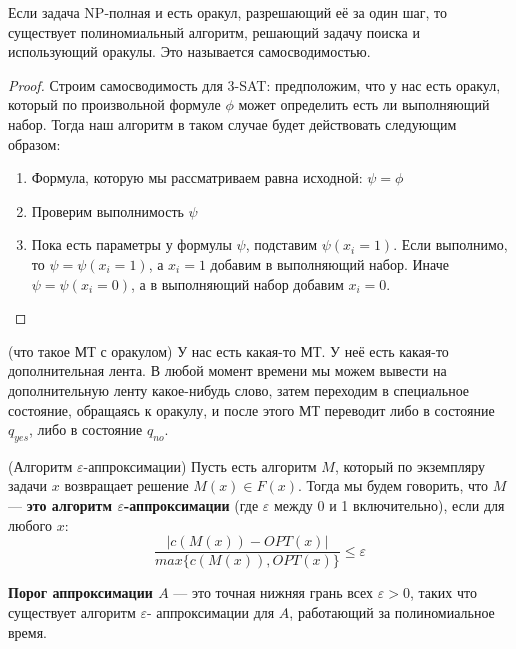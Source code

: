 \documentclass[11pt]{article}
\begin{document}
\begin{statement}
    Если задача NP-полная и есть оракул, разрешающий её за один шаг, то существует полиномиальный алгоритм, решающий задачу поиска и использующий оракулы. Это называется самосводимостью. 
\end{statement}

\begin{proof}
        Строим самосводимость для 3-SAT: предположим, что у нас есть оракул, который по произвольной формуле $\phi$ может определить есть ли выполняющий набор.
        Тогда наш алгоритм в таком случае будет действовать следующим образом: 
        \begin{enumerate}
            \item Формула, которую мы рассматриваем равна исходной: $\psi = \phi$
            \item Проверим выполнимость $\psi$ 
            \item Пока есть параметры у формулы $\psi$, подставим $\psi(x_i=1)$. Если выполнимо, то $\psi = \psi(x_i=1)$, а $x_i=1$ добавим в выполняющий набор.
            Иначе $\psi = \psi(x_i=0)$, а в выполняющий набор добавим $x_i=0$.   
        \end{enumerate}
\end{proof}

\begin{definition}
    (что такое МТ с оракулом) У нас есть какая-то  МТ. У неё есть какая-то дополнительная лента. В любой момент времени мы можем вывести на дополнительную ленту какое-нибудь слово, затем переходим в специальное состояние, обращаясь к оракулу, и после этого МТ переводит либо в состояние $q_{yes}$, либо в состояние $q_{no}$. 
\end{definition}


\begin{definition}
    (Алгоритм $\varepsilon$-аппроксимации) Пусть есть алгоритм $M$, который по экземпляру задачи $x$ возвращает решение $M(x)\in F(x)$. Тогда мы будем говорить,
    что $M$ --- \textbf{это алгоритм $\varepsilon$-аппроксимации} (где $\varepsilon$ между 0 и 1 включительно), если для любого $x$:
    \[ \frac{|c(M(x))-OPT(x)|}{max \{ c(M(x)), OPT(x) \} } \leq \varepsilon \] 
\end{definition}

\begin{definition}
    \textbf{Порог аппроксимации $A$} --- это точная нижняя грань всех $\varepsilon>0$, таких что существует алгоритм $\varepsilon$- аппроксимации для $A$, работающий за полиномиальное время. 
\end{definition}
\end{document}
